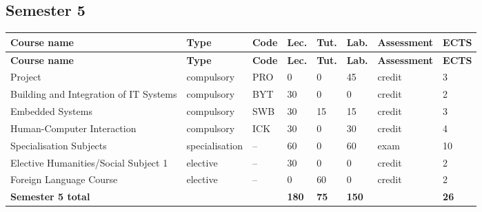 \documentclass[12pt,a4paper]{article}
\newcommand{\thdrule}{\noalign{\global\setlength{\extrarowheight}{0pt}}}
\newcommand{\thdend}{\noalign{\global\setlength{\extrarowheight}{4pt}}}
\begin{document}
\clearpage
\subsection*{Semester 5}

{\scriptsize
\begin{longtable}{m{5.0cm}m{1.9cm}m{0.75cm}m{0.85cm}m{0.85cm}m{0.85cm}m{1.45cm}m{0.9cm}}
\thdrule\toprule
\rowcolor{pjatkRed}
{\color{white}\footnotesize\textbf{\vphantom{Ag}Course name}} & {\color{white}\footnotesize\textbf{\vphantom{Ag}Type}} & {\color{white}\footnotesize\textbf{\vphantom{Ag}Code}} & {\color{white}\footnotesize\textbf{\vphantom{Ag}Lec.}} & {\color{white}\footnotesize\textbf{\vphantom{Ag}Tut.}} & {\color{white}\footnotesize\textbf{\vphantom{Ag}Lab.}} & {\color{white}\footnotesize\textbf{\vphantom{Ag}Assessment}} & {\color{white}\footnotesize\textbf{\vphantom{Ag}ECTS}} \\
\midrule\thdend
\endfirsthead
\thdrule\toprule
\rowcolor{pjatkRed}
{\color{white}\footnotesize\textbf{\vphantom{Ag}Course name}} & {\color{white}\footnotesize\textbf{\vphantom{Ag}Type}} & {\color{white}\footnotesize\textbf{\vphantom{Ag}Code}} & {\color{white}\footnotesize\textbf{\vphantom{Ag}Lec.}} & {\color{white}\footnotesize\textbf{\vphantom{Ag}Tut.}} & {\color{white}\footnotesize\textbf{\vphantom{Ag}Lab.}} & {\color{white}\footnotesize\textbf{\vphantom{Ag}Assessment}} & {\color{white}\footnotesize\textbf{\vphantom{Ag}ECTS}} \\
\midrule\thdend
\endhead
\rowcolor{tableRowLight} Project & {\scriptsize compulsory} & PRO & 0 & 0 & 45 & {\scriptsize credit} & 3 \\
\rowcolor{tableRowAlt} Building and Integration of IT Systems & {\scriptsize compulsory} & BYT & 30 & 0 & 0 & {\scriptsize credit} & 2 \\
\rowcolor{tableRowLight} Embedded Systems & {\scriptsize compulsory} & SWB & 30 & 15 & 15 & {\scriptsize credit} & 3 \\
\rowcolor{tableRowAlt} Human-Computer Interaction & {\scriptsize compulsory} & ICK & 30 & 0 & 30 & {\scriptsize credit} & 4 \\
\rowcolor{tableElective} Specialisation Subjects & {\scriptsize specialisation} & -- & 60 & 0 & 60 & {\scriptsize exam} & 10 \\
\rowcolor{tableElective} Elective Humanities/Social Subject 1 & {\scriptsize elective} & -- & 30 & 0 & 0 & {\scriptsize credit} & 2 \\
\rowcolor{tableElective} Foreign Language Course & {\scriptsize elective} & -- & 0 & 60 & 0 & {\scriptsize credit} & 2 \\
\midrule[\heavyrulewidth]
\rowcolor{tableSummary} \textbf{Semester 5 total} & & & \textbf{180} & \textbf{75} & \textbf{150} & & \textbf{26} \\
\bottomrule
\end{longtable}}
\end{document}
